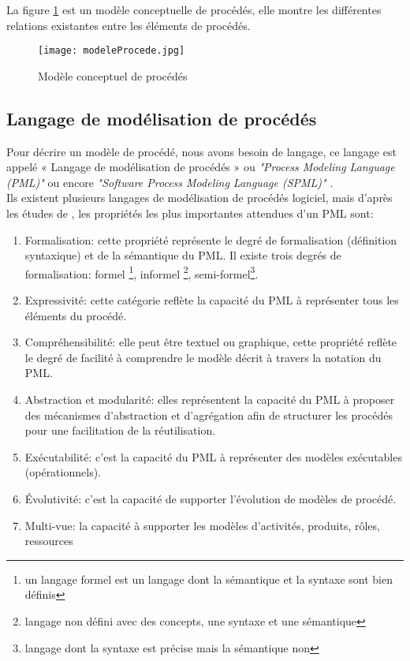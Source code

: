 \clearpage
La figure \ref{mcp} est un modèle conceptuelle de procédés, elle montre les différentes relations existantes entre les éléments de procédés.
\begin{figure}[h]
\centering
\texttt{[image: modeleProcede.jpg]}
\caption{\label{mcp}Modèle conceptuel de procédés \cite{hnt10}}
\end{figure}

\subsection{Langage de modélisation de procédés }
Pour décrire un modèle de procédé, nous avons besoin de langage, ce langage est appelé « Langage de modélisation de procédés » ou \textit{"Process Modeling Language (PML)"} \cite{ac} \cite{rc} \cite{sl} ou encore \textit{"Software Process Modeling Language (SPML)"} \cite{alm}. \\
Ils existent plusieurs langages de modélisation de procédés logiciel, mais d'après les études de \cite{abgm} \cite{vra} \cite{jab}, les propriétés les plus importantes attendues d'un PML sont:
\begin{enumerate}
\item Formalisation: cette propriété représente le degré de formalisation (définition syntaxique) et de la sémantique du PML. Il existe trois degrés de formalisation: formel \footnote{un langage formel est un langage dont la sémantique et la syntaxe sont bien définis}, informel \footnote{langage non défini avec des concepts, une syntaxe et une sémantique}, semi-formel\footnote{langage dont la syntaxe est précise mais la sémantique non}.
\item Expressivité: cette catégorie reflète la capacité du PML à représenter tous les éléments du procédé.
\item Compréhensibilité: elle peut être textuel ou graphique, cette propriété reflète le degré de facilité à comprendre le modèle décrit à travers la notation du PML.
\item Abstraction et modularité: elles représentent la capacité du PML à proposer des mécanismes d'abstraction et d'agrégation afin de structurer les procédés pour une facilitation de la réutilisation.
\item Exécutabilité: c'est la capacité du PML à représenter des modèles exécutables (opérationnels). 
\item Évolutivité: c'est la capacité de supporter l'évolution de modèles de procédé. 
\item Multi-vue: la capacité à supporter les modèles d'activités, produits, rôles, ressources 
\end{enumerate}
